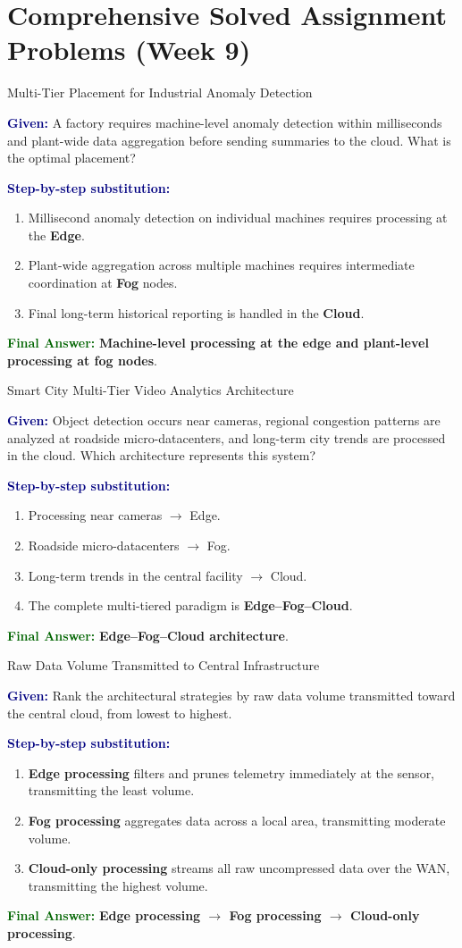 \documentclass[11pt,a4paper,openany]{report}
\newcommand{\Given}{\par\textbf{\textcolor{navy}{Given:}} }
\newcommand{\Steps}{\par\textbf{\textcolor{navy}{Step-by-step substitution:}}\par}
\newcommand{\Answer}{\par\textbf{\textcolor{darkgreen}{Final Answer:}} }
\begin{document}
\section{Comprehensive Solved Assignment Problems (Week 9)}

\begin{solved}{Multi-Tier Placement for Industrial Anomaly Detection}
\Given A factory requires machine-level anomaly detection within milliseconds and plant-wide data aggregation before sending summaries to the cloud. What is the optimal placement?
\Steps
\begin{enumerate}[leftmargin=*]
  \item Millisecond anomaly detection on individual machines requires processing at the \textbf{Edge}.
  \item Plant-wide aggregation across multiple machines requires intermediate coordination at \textbf{Fog} nodes.
  \item Final long-term historical reporting is handled in the \textbf{Cloud}.
\end{enumerate}
\Answer \textbf{Machine-level processing at the edge and plant-level processing at fog nodes}.
\end{solved}

\begin{solved}{Smart City Multi-Tier Video Analytics Architecture}
\Given Object detection occurs near cameras, regional congestion patterns are analyzed at roadside micro-datacenters, and long-term city trends are processed in the cloud. Which architecture represents this system?
\Steps
\begin{enumerate}[leftmargin=*]
  \item Processing near cameras $\to$ Edge.
  \item Roadside micro-datacenters $\to$ Fog.
  \item Long-term trends in the central facility $\to$ Cloud.
  \item The complete multi-tiered paradigm is \textbf{Edge--Fog--Cloud}.
\end{enumerate}
\Answer \textbf{Edge--Fog--Cloud architecture}.
\end{solved}

\begin{solved}{Raw Data Volume Transmitted to Central Infrastructure}
\Given Rank the architectural strategies by raw data volume transmitted toward the central cloud, from lowest to highest.
\Steps
\begin{enumerate}[leftmargin=*]
  \item \textbf{Edge processing} filters and prunes telemetry immediately at the sensor, transmitting the least volume.
  \item \textbf{Fog processing} aggregates data across a local area, transmitting moderate volume.
  \item \textbf{Cloud-only processing} streams all raw uncompressed data over the WAN, transmitting the highest volume.
\end{enumerate}
\Answer \textbf{Edge processing $\to$ Fog processing $\to$ Cloud-only processing}.
\end{solved}
\end{document}
